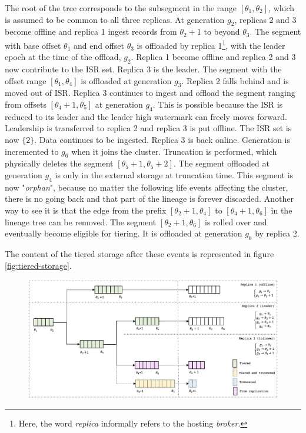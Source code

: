 \documentclass{article}
\begin{document}
\begin{outline}[enumerate]
\1 The root of the tree corresponds to the subsegment in the range $[\theta_1, \theta_2]$, which is assumed to be common to all three replicas.
\1 At generation $g_2$, replicas 2 and 3 become offline and replica 1 ingest records from $\theta_{2} + 1$ to beyond $\theta_3$. The segment with base offset $\theta_1$ and end offset $\theta_3$ is offloaded by replica 1\footnote{Here, the word \textit{replica} informally refers to the hosting \textit{broker}.}, with the leader epoch at the time of the offload, $g_2$.
\1 Replica 1 become offline and replica 2 and 3 now contribute to the ISR set. Replica 3 is the leader. The segment with the offset range $[\theta_1, \theta_4]$ is offloaded at generation $g_3$.
\1 Replica 2 falls behind and is moved out of ISR. Replica 3 continues to ingest and offload the segment ranging from offsets $[\theta_4 + 1, \theta_5]$ at generation $g_4$. This is possible because the ISR is reduced to its leader and the leader high watermark can freely moves forward.
\1 Leadership is transferred to replica 2 and replica 3 is put offline. The ISR set is now $\{2\}$. Data continues to be ingested.
\1 Replica 3 is back online. Generation is incremented to $g_6$ when it joins the cluster. Truncation is performed, which physically deletes the segment $[\theta_{5}+1, \theta_{5}+2]$. The segment offloaded at generation $g_4$ is only in the external storage at truncation time. This segment is now "\textit{orphan}", because no matter the following life events affecting the cluster, there is no going back and that part of the lineage is forever discarded. Another way to see it is that the edge from the prefix $[\theta_2+1,\theta_4]$ to $[\theta_4+1,\theta_6]$ in the lineage tree can be removed.
\1 The segment $[\theta_2+1,\theta_6]$ is rolled over and eventually become eligible for tiering. It is offloaded at generation $g_6$ by replica 2.
\end{outline}

The content of the tiered storage after these events is represented in figure \ref{fig:tiered-storage}.

\begin{figure}[h!]
	\centering
	\includegraphics[scale=0.55]{lineage-tree-1.png}
	\label{fig:lineage-tree-1}
\end{figure}
\end{document}
